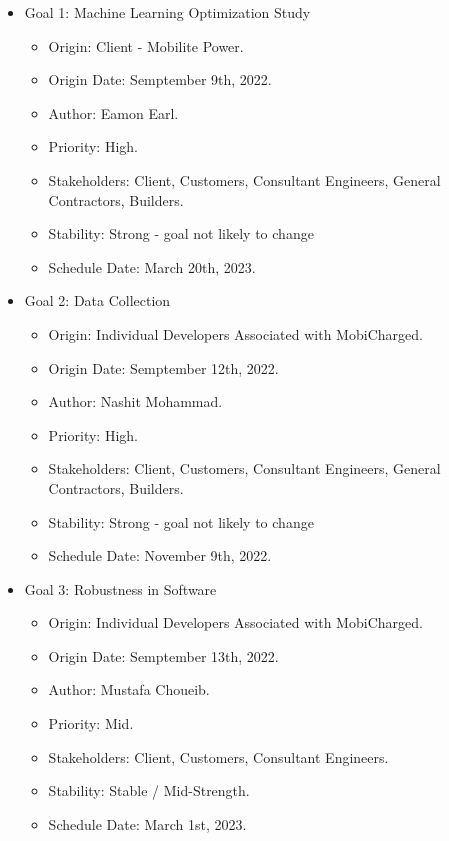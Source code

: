 \documentclass[12pt, titlepage]{article}
\begin{document}
\begin{itemize}
    \item Goal 1: Machine Learning Optimization Study
    \begin{itemize}
        \item Origin: Client - Mobilite Power.
        \item Origin Date: Semptember 9th, 2022.
        \item Author: Eamon Earl.
        \item Priority: High.
        \item Stakeholders: Client, Customers, Consultant Engineers, General Contractors, Builders.
        \item Stability: Strong - goal not likely to change
        \item Schedule Date: March 20th, 2023.
    \end{itemize}
    \item Goal 2: Data Collection
    \begin{itemize}
        \item Origin: Individual Developers Associated with MobiCharged.
        \item Origin Date: Semptember 12th, 2022.
        \item Author: Nashit Mohammad.
        \item Priority: High.
        \item Stakeholders: Client, Customers, Consultant Engineers, General Contractors, Builders.
        \item Stability: Strong - goal not likely to change
        \item Schedule Date: November 9th, 2022.
    \end{itemize}
    \item Goal 3: Robustness in Software
    \begin{itemize}
        \item Origin: Individual Developers Associated with MobiCharged.
        \item Origin Date: Semptember 13th, 2022.
        \item Author: Mustafa Choueib.
        \item Priority: Mid.
        \item Stakeholders: Client, Customers, Consultant Engineers.
        \item Stability: Stable / Mid-Strength.
        \item Schedule Date: March 1st, 2023.
    \end{itemize}

\end{itemize}
\end{document}
